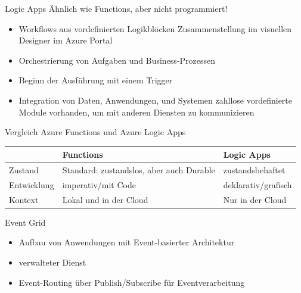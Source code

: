 \begin{flashcard}[Definition]{Logic Apps}
    Ähnlich wie Functions, aber nicht programmiert!
    \begin{itemize}
        \item Workflows aus vordefinierten Logikblöcken\newline
        Zusammenstellung im visuellen Designer im Azure Portal
        \item Orchestrierung von Aufgaben und Business-Prozessen
        \item Beginn der Ausführung mit einem Trigger
        \item Integration von Daten, Anwendungen, und Systemen\newline
        zahllose vordefinierte Module vorhanden, um mit anderen Diensten zu kommunizieren
    \end{itemize}

\end{flashcard}

\begin{flashcard}[\ ]{Vergleich Azure Functions und Azure Logic Apps}
    \begin{tabular}{l|p{34mm}p{34mm}}
                    & \textbf{Functions}                       & \textbf{Logic Apps} \\
        \hline
        Zustand     & Standard: zustandslos, aber auch Durable & zustandsbehaftet    \\
        Entwicklung & imperativ/mit Code                       & deklarativ/grafisch \\
        Kontext     & Lokal und in der Cloud                   & Nur in der Cloud    \\
    \end{tabular}
\end{flashcard}

\begin{flashcard}[Describe]{Event Grid}
    \begin{itemize}
        \item Aufbau von Anwendungen mit Event-basierter Architektur
        \item verwalteter Dienst
        \item Event-Routing über Publish/Subscribe für Eventverarbeitung
    \end{itemize}

\end{flashcard}

